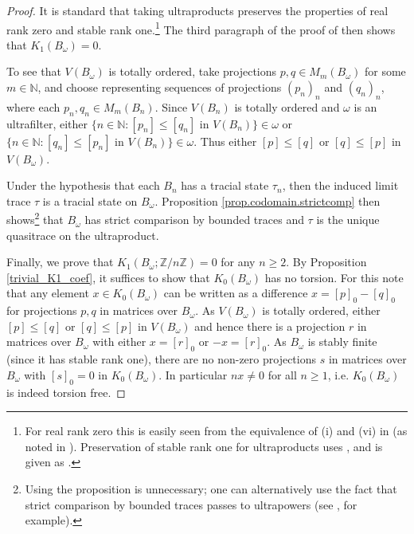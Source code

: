 \documentclass[reqno]{amsart}
\theoremstyle{definition}
\theoremstyle{remark}
\numberwithin{equation}{section}
\theoremstyle{definition}
\begin{document}
\begin{proof}
It is standard that taking ultraproducts preserves the properties of real rank zero and stable rank one.\footnote{For real rank zero this is easily seen from the equivalence of (i) and (vi) in \cite[Theorem 2.6]{BrownPedersen:JFA} (as noted in \cite[Example 2.4.2]{ModelMemoir}). Preservation of stable rank one for ultraproducts uses \cite[Theorem 5]{Pedersen:JOT}, and is given as \cite[Lemma 19.2.2(1)]{Loring:Book}.} The third paragraph of the proof of \cite[Proposition 3.2 (2)]{TWW:Annals} then shows that $K_{1}(B_{\omega}) = 0$. 

To see that $V(B_\omega)$ is totally ordered, take projections $p, q\in M_{m}(B_{\omega})$ for some $m\in \mathbb{N}$, and choose representing  sequences of projections $(p_{n})_n$ and $(q_{n})_n$, where each $p_{n}, q_{n}\in M_{m}(B_{n})$. Since $V(B_{n})$ is totally ordered and $\omega$ is an ultrafilter, either $\{n\in\mathbb{N}: [p_{n}]\leq [q_{n}]\text{ in } V(B_{n})\}\in \omega$ or $\{n\in\mathbb{N}: [q_{n}]\leq [p_{n}]\text{ in } V(B_{n})\}\in \omega$. Thus either $[p]\leq [q]$ or $[q]\leq [p]$ in $V(B_{\omega})$. 

Under the hypothesis that each $B_n$ has a tracial state $\tau_n$, then the induced limit trace $\tau$ is a tracial state on $B_\omega$. Proposition \ref{prop.codomain.strictcomp} then shows\footnote{Using the proposition is unnecessary; one can alternatively use the fact that strict comparison by bounded traces passes to ultrapowers (see \cite[Lemma 1.23]{BBSTWW}, for example).} that $B_\omega$ has strict comparison by bounded traces and $\tau$ is the unique quasitrace on the ultraproduct. 

Finally, we prove that $K_{1}(B_{\omega}; \mathbb{Z}/n\mathbb{Z}) = 0$ for any $n\geq 2$. By Proposition \ref{trivial_K1_coef}, it suffices to show that $K_{0}(B_{\omega})$ has no torsion. For this note that any element $x\in K_0(B_\omega)$ can be written as a difference $x=[p]_0-[q]_0$ for projections $p,q$ in matrices over $B_\omega$. As $V(B_\omega)$ is totally ordered, either $[p]\leq [q]$ or $[q]\leq [p]$ in $V(B_\omega)$ and hence there is a projection $r$ in matrices over $B_\omega$ with either $x=[r]_0$ or $-x=[r]_0$. As $B_\omega$ is stably finite (since it has stable rank one), there are no non-zero projections $s$ in matrices over $B_\omega$ with $[s]_0=0$ in $K_0(B_\omega)$. In particular $nx\neq 0$ for all $n\geq 1$, i.e. $K_0(B_\omega)$ is indeed torsion free.
\end{proof} 
\end{document}
